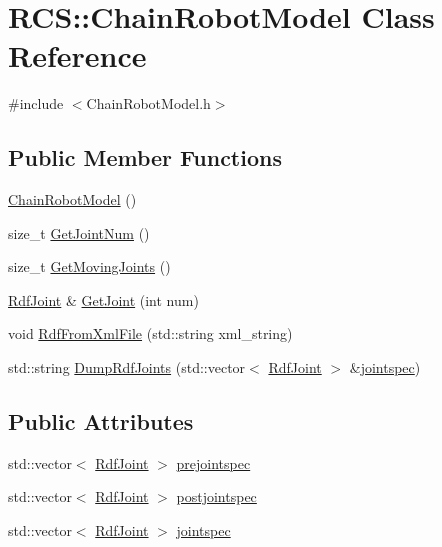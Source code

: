 \hypertarget{classRCS_1_1ChainRobotModel}{\section{R\-C\-S\-:\-:Chain\-Robot\-Model Class Reference}
\label{classRCS_1_1ChainRobotModel}
}


{\ttfamily \#include $<$Chain\-Robot\-Model.\-h$>$}

\subsection*{Public Member Functions}
\begin{DoxyCompactItemize}
\item 
\hyperlink{classRCS_1_1ChainRobotModel_afb9f3dcd9a9a24d6f0e191c93bb2fb68}{Chain\-Robot\-Model} ()
\item 
size\-\_\-t \hyperlink{classRCS_1_1ChainRobotModel_ac5ee73dfe107ef5f7b4475b68d0158f2}{Get\-Joint\-Num} ()
\item 
size\-\_\-t \hyperlink{classRCS_1_1ChainRobotModel_ac5bd020b4cc68ed33c99467a303e19ed}{Get\-Moving\-Joints} ()
\item 
\hyperlink{structRCS_1_1RdfJoint}{Rdf\-Joint} \& \hyperlink{classRCS_1_1ChainRobotModel_a62f2da014d60b16f5567ff90d9b685b5}{Get\-Joint} (int num)
\item 
void \hyperlink{classRCS_1_1ChainRobotModel_acaf0c6a5f7ccf3e8c9c0bb6225cadcca}{Rdf\-From\-Xml\-File} (std\-::string xml\-\_\-string)
\item 
std\-::string \hyperlink{classRCS_1_1ChainRobotModel_afe90a78dcf01f87e343ccd904744bd4b}{Dump\-Rdf\-Joints} (std\-::vector$<$ \hyperlink{structRCS_1_1RdfJoint}{Rdf\-Joint} $>$ \&\hyperlink{classRCS_1_1ChainRobotModel_aeac2fe8d84501b374bc2f6170bf751ae}{jointspec})
\end{DoxyCompactItemize}
\subsection*{Public Attributes}
\begin{DoxyCompactItemize}
\item 
std\-::vector$<$ \hyperlink{structRCS_1_1RdfJoint}{Rdf\-Joint} $>$ \hyperlink{classRCS_1_1ChainRobotModel_af7951f5cf300a83c4a5bbe5ef0c42ad1}{prejointspec}
\item 
std\-::vector$<$ \hyperlink{structRCS_1_1RdfJoint}{Rdf\-Joint} $>$ \hyperlink{classRCS_1_1ChainRobotModel_a6f2304b0bc530b4a2f67b9932808f510}{postjointspec}
\item 
std\-::vector$<$ \hyperlink{structRCS_1_1RdfJoint}{Rdf\-Joint} $>$ \hyperlink{classRCS_1_1ChainRobotModel_aeac2fe8d84501b374bc2f6170bf751ae}{jointspec}
\end{DoxyCompactItemize}


